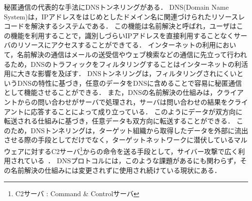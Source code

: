 秘匿通信の代表的な手法にDNSトンネリングがある．
DNS(Domain Name System)は，IPアドレスをはじめとしたドメイン名に関連づけられたリソースレコードを解決するシステムである．
この機能は名前解決と呼ばれ，ユーザはこの機能を利用することで，識別しづらいIPアドレスを直接利用することなくサーバのリソースにアクセスすることができてる．
インターネットの利用において，名前解決の通信はメールの送受信やウェブ検索などの通信に先立って行われるため，DNSのトラフィックをフィルタリングすることはインターネットの利活用に大きな影響を及ぼす．
DNSトンネリングは，フィルタリングされにくいというDNSの特性に基づき，任意のデータをDNSに含めることで容易に秘匿通信として機能させることができる．
また，DNSの名前解決の仕組みは，クライアントからの問い合わせがサーバで処理され，サーバは問い合わせの結果をクライアントに応答することによって成り立っている．
このようにデータが双方向に転送される仕組みに基づき，任意データも双方向に転送することができる．
このため，DNSトンネリングは，ターゲット組織から取得したデータを外部に流出させる際の手段としてだけでなく，ターゲットネットワークに潜伏しているマルウェアに対するC2サーバ\footnote{C2サーバ : Command \& Controlサーバ}からの命令を送る手段として，サイバー攻撃で広く利用されている~\cite{frameworkpos, bondupdater, bernhardpos, multigrainpos, pisloader, denis, dnsmessenger, udpos}．
DNSプロトコルには，このような課題があるにも関わらず，その名前解決の仕組みには変更されずに使用され続けている現状にある．
